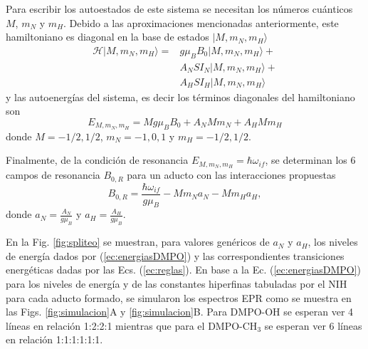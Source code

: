 \documentclass[aps,prl,reprint,superscriptaddress,showkeys]{revtex4-2}
\begin{document}
Para escribir los autoestados de este sistema se necesitan los números cuánticos $M$, $m_N$ y $m_H$. Debido a las aproximaciones mencionadas anteriormente, este hamiltoniano es diagonal en la base de estados $|M,m_N,m_H \rangle$ 
\begin{align}
    \mathcal{H} |M ,m_N, m_H \rangle = &g \mu_B B_0 |M ,m_N, m_H \rangle + \nonumber \\
    &A_N S I_N |M ,m_N, m_H \rangle + \nonumber \\
    &A_H S I_H |M ,m_N, m_H  \rangle
    \label{ec:hamiltoniano_DMPOOH}
\end{align}
y las autoenergías del sistema, es decir los términos diagonales del hamiltoniano son
\begin{equation}
    E_{M, m_N, m_H} = M g \mu_B B_0 + A_N M m_N +  A_H M m_H 
    \label{ec:energiasDMPO}
\end{equation}
donde $M = -1/2, 1/2$, $m_N=-1,0,1$ y $m_H=-1/2,1/2$.

Finalmente, de la condición de resonancia $E_{M, m_N, m_H} = \hbar \omega_{if}$, se determinan los 6 campos de resonancia $B_{0,R}$ para un aducto con las interacciones propuestas
\begin{equation}
B_{0,R} = \frac{\hbar\omega_{if}}{g \mu_B} -  M m_N a_N - M m_H a_H,    
\label{ec:campos}
\end{equation}
donde $a_N = \frac{A_N}{g \mu_B}$ y $a_H = \frac{A_H}{g\mu_B}$.

En la Fig. \ref*{fig:spliteo} se muestran, para valores genéricos de $a_N$ y $a_H$, los niveles de energía dados por (\ref*{ec:energiasDMPO}) y las correspondientes transiciones energéticas dadas por las Ecs. (\ref*{ec:reglas}). En base a la Ec. (\ref*{ec:energiasDMPO}) para los niveles de energía y de las constantes hiperfinas tabuladas por el NIH para cada aducto formado, se simularon los espectros EPR como se muestra en las Figs. \ref*{fig:simulacion}A y \ref*{fig:simulacion}B. Para DMPO-OH se esperan ver 4 líneas en relación 1:2:2:1 mientras que para el DMPO-CH$_3$ se esperan ver 6 líneas en relación 1:1:1:1:1:1.
\end{document}
